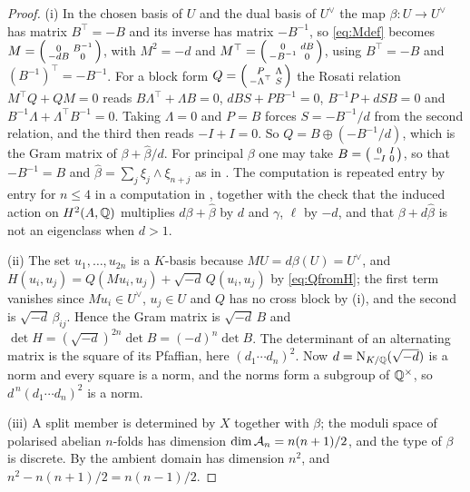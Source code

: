\begin{proof}
(i) In the chosen basis of $U$ and the dual basis of $U^{\vee}$ the map
$\beta\colon U\to U^{\vee}$ has matrix $B^{\top}=-B$ and its inverse has
matrix $-B^{-1}$, so \eqref{eq:Mdef} becomes
$M=\begin{psmallmatrix}0&B^{-1}\\-dB&0\end{psmallmatrix}$, with
$M^{2}=-d$ and
$M^{\top}=\begin{psmallmatrix}0&dB\\-B^{-1}&0\end{psmallmatrix}$, using
$B^{\top}=-B$ and $(B^{-1})^{\top}=-B^{-1}$. For a block form
$Q=\begin{psmallmatrix}P&\Lambda\\-\Lambda^{\top}&S\end{psmallmatrix}$ the
Rosati relation $M^{\top}Q+QM=0$ reads
$B\Lambda^{\top}+\Lambda B=0$, $dBS+PB^{-1}=0$, $B^{-1}P+dSB=0$ and
$B^{-1}\Lambda+\Lambda^{\top}B^{-1}=0$. Taking $\Lambda=0$ and $P=B$ forces
$S=-B^{-1}/d$ from the second relation, and the third then reads $-I+I=0$.
So $Q=B\oplus(-B^{-1}/d)$, which is the Gram matrix of
$\beta+\widehat\beta/d$. For principal $\beta$ one may take
$B=\begin{psmallmatrix}0&I\\-I&0\end{psmallmatrix}$, so that $-B^{-1}=B$
and $\widehat\beta=\sum_{j}\xi_{j}\wedge\xi_{n+j}$ as in
. The computation is repeated entry by entry for
$n\le4$ in a computation in \cite{BMB26}, together with the check
that the induced action on $H^{2}(A,\mathbb{Q})$ multiplies $d\beta+\widehat\beta$
by $d$ and $\gamma$, $\ell$ by $-d$, and that $\beta+d\widehat\beta$ is not
an eigenclass when $d>1$.

(ii) The set $u_{1},\dots,u_{2n}$ is a $K$-basis because
$MU=d\beta(U)=U^{\vee}$, and $H(u_{i},u_{j})=Q(Mu_{i},u_{j})+\sqrt{-d}\,Q(u_{i},u_{j})$
by \eqref{eq:QfromH}; the first term vanishes since $Mu_{i}\in U^{\vee}$,
$u_{j}\in U$ and $Q$ has no cross block by (i), and the second is
$\sqrt{-d}\,\beta_{ij}$. Hence the Gram matrix is $\sqrt{-d}\,B$ and
$\det H=(\sqrt{-d})^{2n}\det B=(-d)^{n}\det B$. The determinant of an
alternating matrix is the square of its Pfaffian, here $(d_{1}\cdots
d_{n})^{2}$. Now $d=\mathrm{N}_{K/\mathbb{Q}}(\sqrt{-d})$ is a norm and every square is a
norm, and the norms form a subgroup of $\mathbb{Q}^{\times}$, so
$d^{\,n}(d_{1}\cdots d_{n})^{2}$ is a norm.

(iii) A split member is determined by $X$ together with $\beta$; the moduli
space of polarised abelian $n$-folds has dimension $\dim\mathcal{A}_{n}=n(n+1)/2$,
and the type of $\beta$ is discrete. By  the ambient domain has
dimension $n^{2}$, and $n^{2}-n(n+1)/2=n(n-1)/2$.


\end{proof}
